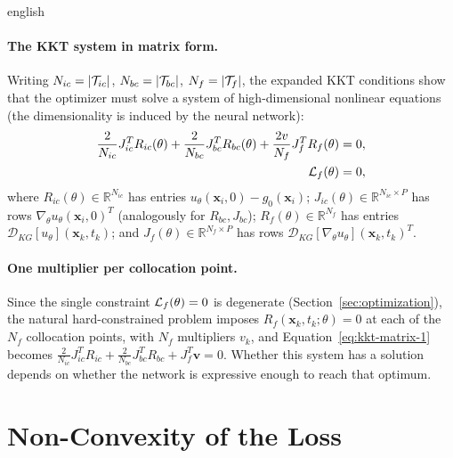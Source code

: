 \begin{hyphenrules}{english}
\paragraph{The KKT system in matrix form.}
Writing $N_{ic}=\left\lvert \mathcal{T}_{ic} \right\rvert$, $N_{bc}=\left\lvert \mathcal{T}_{bc} \right\rvert$, $N_f=\left\lvert \mathcal{T}_f \right\rvert$, the expanded KKT conditions
show that the optimizer must solve a system of high-dimensional nonlinear equations (the
dimensionality is induced by the neural network):
\begin{align}
  \frac{2}{N_{ic}}J_{ic}^{T}R_{ic}(\theta)+\frac{2}{N_{bc}}J_{bc}^{T}R_{bc}(\theta)
  +\frac{2v}{N_f}J_f^{T}R_f(\theta)&=0, \label{eq:kkt-matrix-1}\\
  \mathcal{L}_f(\theta)&=0, \label{eq:kkt-matrix-2}
\end{align}
where $R_{ic}(\theta)\in\mathbb{R}^{N_{ic}}$ has entries $u_\theta(\mathbf{x}_i,0)-g_0(\mathbf{x}_i)$;
$J_{ic}(\theta)\in\mathbb{R}^{N_{ic}\times P}$ has rows $\nabla_\theta u_\theta(\mathbf{x}_i,0)^{T}$ (analogously for
$R_{bc},J_{bc}$); $R_f(\theta)\in\mathbb{R}^{N_f}$ has entries $\mathcal{D}_{KG}[u_\theta](\mathbf{x}_k,t_k)$; and
$J_f(\theta)\in\mathbb{R}^{N_f\times P}$ has rows $\mathcal{D}_{KG}[\nabla_\theta u_\theta](\mathbf{x}_k,t_k)^{T}$.

\paragraph{One multiplier per collocation point.}
Since the single constraint $\mathcal{L}_f(\theta)=0$ is degenerate (Section~\ref{sec:optimization}), the natural
hard-constrained problem imposes $R_f(\mathbf{x}_k,t_k;\theta)=0$ at each of the $N_f$ collocation points,
with $N_f$ multipliers $v_k$, and Equation~\eqref{eq:kkt-matrix-1} becomes
$\frac{2}{N_{ic}}J_{ic}^{T}R_{ic}+\frac{2}{N_{bc}}J_{bc}^{T}R_{bc}+J_f^{T}\mathbf{v}=0$. Whether this
system has a solution depends on whether the network is expressive enough to reach that optimum.

\section{Non-Convexity of the Loss}\label{app-sec:nonconvexity}


\end{hyphenrules}
